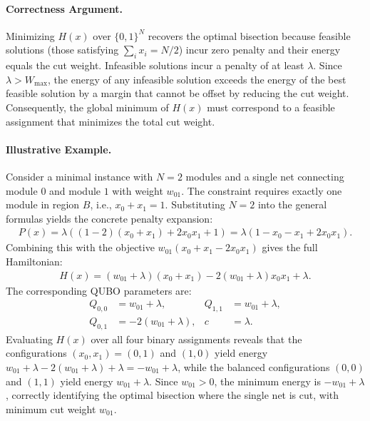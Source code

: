 \documentclass[12pt]{article}
\begin{document}
\paragraph{Correctness Argument.}
Minimizing $H(x)$ over $\{0,1\}^N$ recovers the optimal bisection because feasible solutions (those satisfying $\sum_i x_i = N/2$) incur zero penalty and their energy equals the cut weight. Infeasible solutions incur a penalty of at least $\lambda$. Since $\lambda > W_{\max}$, the energy of any infeasible solution exceeds the energy of the best feasible solution by a margin that cannot be offset by reducing the cut weight. Consequently, the global minimum of $H(x)$ must correspond to a feasible assignment that minimizes the total cut weight.

\paragraph{Illustrative Example.}
Consider a minimal instance with $N=2$ modules and a single net connecting module $0$ and module $1$ with weight $w_{01}$. The constraint requires exactly one module in region $B$, i.e., $x_0 + x_1 = 1$. Substituting $N=2$ into the general formulas yields the concrete penalty expansion:
\begin{align}
    P(x) = \lambda \left( (1-2)(x_0 + x_1) + 2x_0 x_1 + 1 \right) = \lambda \left( 1 - x_0 - x_1 + 2x_0 x_1 \right).
\end{align}
Combining this with the objective $w_{01}(x_0 + x_1 - 2x_0 x_1)$ gives the full Hamiltonian:
\begin{align}
    H(x) = (w_{01} + \lambda)(x_0 + x_1) - 2(w_{01} + \lambda)x_0 x_1 + \lambda.
\end{align}
The corresponding QUBO parameters are:
\begin{align}
    Q_{0,0} &= w_{01} + \lambda, & Q_{1,1} &= w_{01} + \lambda, \\
    Q_{0,1} &= -2(w_{01} + \lambda), & c &= \lambda.
\end{align}
Evaluating $H(x)$ over all four binary assignments reveals that the configurations $(x_0, x_1) = (0,1)$ and $(1,0)$ yield energy $w_{01} + \lambda - 2(w_{01} + \lambda) + \lambda = -w_{01} + \lambda$, while the balanced configurations $(0,0)$ and $(1,1)$ yield energy $w_{01} + \lambda$. Since $w_{01} > 0$, the minimum energy is $-w_{01} + \lambda$, correctly identifying the optimal bisection where the single net is cut, with minimum cut weight $w_{01}$.
\end{document}
